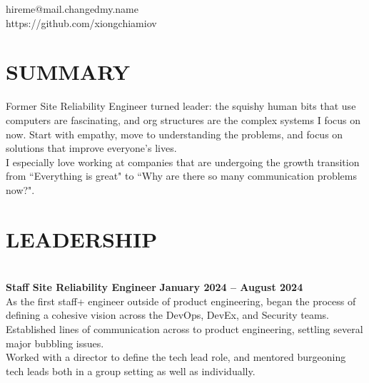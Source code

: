 \documentclass[margin,line]{resume}
\begin{document}
{
    \hfill hireme@mail.changedmy.name       \vspace{0mm}\\\vspace{0mm}%
    \hfill https://github.com/xiongchiamiov \vspace{0mm}\\\vspace{-9mm}%
}

\begin{resume}

    \vspace{-3mm}
    \section{\mysidestyle \textbf{\large{S}\small{UMMARY}}}

    Former Site Reliability Engineer turned leader: the squishy human bits that
    use computers are fascinating, and org structures are the complex systems I
    focus on now.  Start with empathy, move to understanding the problems, and
    focus on solutions that improve everyone's lives.
    \vspace{1.7mm}\\%
    I especially love working at companies that are undergoing the growth
    transition from ``Everything is great" to ``Why are there so many
    communication problems now?".

    \vspace{-1mm}

\sectionline
    \section{\mysidestyle \textbf{\large{L}\small{EADERSHIP}}}

    \vspace{1mm}\\%
    \textbf{Staff Site Reliability Engineer} \hfill \textbf{January 2024 -- August 2024}\\
    As the first staff+ engineer outside of product engineering, began the
    process of defining a cohesive vision across the DevOps, DevEx, and
    Security teams.\\
    Established lines of communication across to product engineering, settling
    several major bubbling issues.\\
    Worked with a director to define the tech lead role, and mentored
    burgeoning tech leads both in a group setting as well as individually.


\end{resume}
\end{document}
